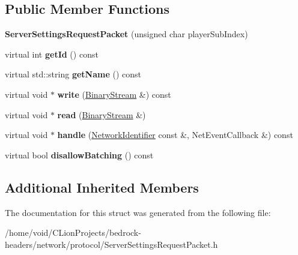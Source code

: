 \subsection*{Public Member Functions}
\begin{DoxyCompactItemize}
\item 
\mbox{\label{struct_server_settings_request_packet_a60077ed6b6043b7ecb8cb554c2652efa}} 
{\bfseries Server\+Settings\+Request\+Packet} (unsigned char player\+Sub\+Index)
\item 
\mbox{\label{struct_server_settings_request_packet_ac66c546cf65c8470af15e295bb101438}} 
virtual int {\bfseries get\+Id} () const
\item 
\mbox{\label{struct_server_settings_request_packet_a25feedfcbad86933ab38194f92955624}} 
virtual std\+::string {\bfseries get\+Name} () const
\item 
\mbox{\label{struct_server_settings_request_packet_a7f8088b4924933e7694e2947b0f316af}} 
virtual void $\ast$ {\bfseries write} (\mbox{\hyperlink{struct_binary_stream}{Binary\+Stream}} \&) const
\item 
\mbox{\label{struct_server_settings_request_packet_a73bdff5cea56b755e49844225bafd873}} 
virtual void $\ast$ {\bfseries read} (\mbox{\hyperlink{struct_binary_stream}{Binary\+Stream}} \&)
\item 
\mbox{\label{struct_server_settings_request_packet_afc3140ab2049377571ce6d78fa4ba001}} 
virtual void $\ast$ {\bfseries handle} (\mbox{\hyperlink{struct_network_identifier}{Network\+Identifier}} const \&, Net\+Event\+Callback \&) const
\item 
\mbox{\label{struct_server_settings_request_packet_abd8bddab1d0fca337b2ba3ebbb88ad50}} 
virtual bool {\bfseries disallow\+Batching} () const
\end{DoxyCompactItemize}
\subsection*{Additional Inherited Members}


The documentation for this struct was generated from the following file\+:\begin{DoxyCompactItemize}
\item 
/home/void/\+C\+Lion\+Projects/bedrock-\/headers/network/protocol/Server\+Settings\+Request\+Packet.\+h\end{DoxyCompactItemize}
